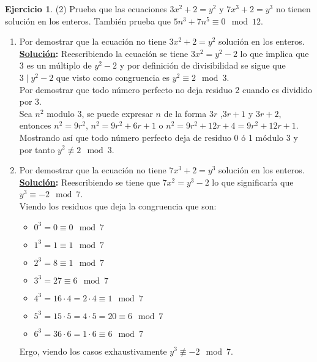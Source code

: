 \documentclass[11pt,letterpaper]{article}
\theoremstyle{definition}\newtheorem{p}{Ejercicio}
\newcommand{\sol}{\textbf{\underline{Solución}: }} %
\begin{document}
\begin{p}(2)
Prueba que las ecuaciones $3x^2+2=y^2$ y $7x^3+2=y^3$ no tienen soluci\'on en los enteros.
Tambi\'en prueba que $5n^3+7n^5 \equiv 0\mod 12$.
\begin{enumerate}
    \item Por demostrar que la ecuación no tiene $3x^2+2=y^2$ solución en los enteros.\\
    \sol Reescribiendo la ecuación se tiene $3x^2 = y^2 -2$ lo que implica que 3 es un múltiplo de
    $y^2 -2$ y por definición de divisibilidad se sigue que $3 \mid y^2 - 2$ que visto como
    congruencia es $y^2 \equiv 2 \mod{3}$.\\
    Por demostrar que todo número perfecto no deja residuo 2 cuando es dividido por 3.\\
    Sea $n^2$ modulo 3, se puede expresar $n$ de la forma $3r$ ,$3r+1$ y $3r+2$, entonces 
    $n^2 = 9r^2$, $n^2 = 9r^2 + 6r + 1$ o $n^2  = 9r^2 + 12r + 4 = 9r^2 + 12r + 1$. Mostrando así
    que todo número perfecto deja de residuo 0 ó 1 módulo 3 y por tanto $y^2 \not\equiv 2 \mod{3}$.

    \item Por demostrar que la ecuación no tiene $7x^3+2=y^3$ solución en los enteros.\\
    \sol Reescribiendo se tiene que $7x^2 = y^3 -2$ lo que significaría que $y^3 \equiv -2 \mod{7}$.\\
    Viendo los residuos que deja la congruencia que son:
    \begin{itemize}
        \item $0^3 = 0 \equiv 0 \mod{7}$
        \item $1^3 = 1 \equiv 1 \mod{7}$
        \item $2^3 = 8 \equiv 1 \mod{7}$
        \item $3^3 = 27 \equiv 6 \mod{7}$
        \item $4^3 = 16 \cdot 4 = 2 \cdot 4 \equiv 1 \mod{7}$
        \item $5^3 = 15 \cdot 5 = 4 \cdot 5 = 20 \equiv 6 \mod{7}$
        \item $6^3 = 36 \cdot 6 = 1 \cdot 6 \equiv 6 \mod{7}$
    \end{itemize}
    Ergo, viendo los casos exhaustivamente $y^3 \not\equiv -2 \mod{7}$.


\end{enumerate}
\end{p}
\end{document}
